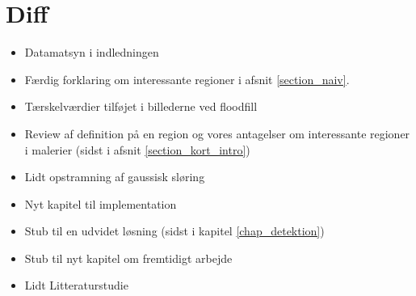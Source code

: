 {
\section*{Diff}
\begin{itemize}
    \item Datamatsyn i indledningen
    \item Færdig forklaring om interessante regioner i afsnit
        \ref{section_naiv}.
    \item Tærskelværdier tilføjet i billederne ved floodfill
    \item Review af definition på en region og vores antagelser om
        interessante regioner i malerier (sidst i afsnit
        \ref{section_kort_intro})
    \item Lidt opstramning af gaussisk sløring
    \item Nyt kapitel til implementation
    \item Stub til en udvidet løsning (sidst i kapitel
        \ref{chap_detektion})
    \item Stub til nyt kapitel om fremtidigt arbejde
	\item Lidt Litteraturstudie
\end{itemize}
}

